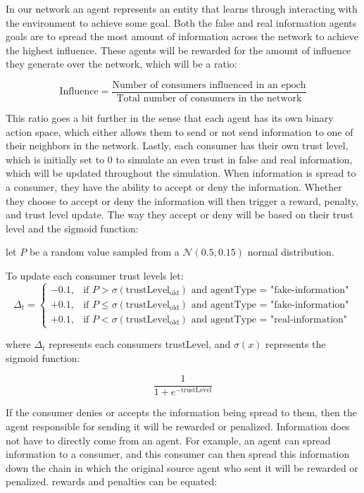 \documentclass[twoside]{article}
\begin{document}
In our network an agent represents an entity that learns through interacting with the environment to achieve some goal. Both the false and real information agents goals are to spread the most amount of information across the network to achieve the highest influence. These agents will be rewarded for the amount of influence they generate over the network, which will be a ratio:

\[
\text{Influence} = \frac{\text{Number of consumers influenced in an epoch}}{\text{Total number of consumers in the network}}
\]

This ratio goes a bit further in the sense that each agent has its own binary action space, which either allows them to send or not send information to one of their neighbors in the network. Lastly, each consumer has their own trust level, which is initially set to 0 to simulate an even trust in false and real information, which will be updated throughout the simulation. When information is spread to a consumer, they have the ability to accept or deny the information. Whether they choose to accept or deny the information will then trigger a reward, penalty, and trust level update. The way they accept or deny will be based on their trust level and the sigmoid function:

let $P$ be a random value sampled from a $\mathcal{N}(0.5, 0.15)$ normal distribution.

To update each consumer trust levels let:
\[
\Delta_{t} = 
\begin{cases} 
-0.1, & \text{if } P > \sigma(\text{trustLevel}_{\text{old}}) \text{ and agentType = "fake-information"} \\
+0.1, & \text{if } P \leq \sigma(\text{trustLevel}_{\text{old}}) \text{ and agentType = "fake-information"}\\
+0.1, & \text{if } P < \sigma(\text{trustLevel}_{\text{old}}) \text{ and agentType = "real-information"}
\end{cases}
\]

where $\Delta_{t}$ represents each consumers trustLevel, and $\sigma(x)$ represents the sigmoid function:

\[
\frac{1}{1 + e^{-\text{trustLevel}}}
\]

If the consumer denies or accepts the information being spread to them, then the agent responsible for sending it will be rewarded or penalized. Information does not have to directly come from an agent. For example, an agent can spread information to a consumer, and this consumer can then spread this information down the chain in which the original source agent who sent it will be rewarded or penalized. rewards and penalties can be equated:
\end{document}
